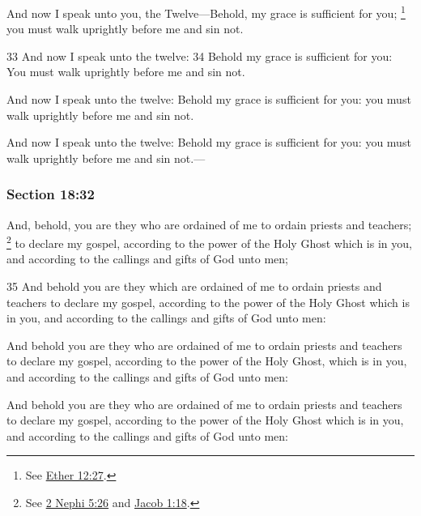 		And now I speak unto you, the Twelve---Behold, my grace is sufficient for you;%
			\footnote{%
				See \hyperref[ETHER-12-27]{Ether 12:27}.
				}
		you must walk uprightly before me and sin not.

		\begin{framed}
		\scriptsize
			\begin{compactdesc}
				\item[JSP] 33 And now I speak unto the twelve: 34 Behold my grace is sufficient for you: You must walk uprightly before me and sin not.
				\item[DC 1835] And now I speak unto the twelve: Behold my grace is sufficient for you: you must walk uprightly before me and sin not. 
				\item[DC 1844] And now I speak unto the twelve: Behold my grace is sufficient for you: you must walk uprightly before me and sin not.--- 
			\end{compactdesc}
		\end{framed}

	\subsubsection{Section 18:32} %
		\label{DC18-32}

		And, behold, you are they who are ordained of me to ordain priests and teachers;%
			\footnote{%
				See \hyperref[2NEPHI-5-26]{2 Nephi 5:26} and \hyperref[JACOB-1-18]{Jacob 1:18}.
				}
		to declare my gospel, according to the power of the Holy Ghost which is in you, and according to the callings and gifts of God unto men;

		\begin{framed}
		\scriptsize
			\begin{compactdesc}
				\item[JSP] 35 And behold you are they which are ordained of me to ordain priests and teachers to declare my gospel, according to the power of the Holy Ghost which is in you, and according to the callings and gifts of God unto men:
				\item[DC 1835] And behold you are they who are ordained of me to ordain priests and teachers to declare my gospel, according to the power of the Holy Ghost, which is in you, and according to the callings and gifts of God unto men: 
				\item[DC 1844] And behold you are they who are ordained of me to ordain priests and teachers to declare my gospel, according to the power of the Holy Ghost which is in you, and according to the callings and gifts of God unto men: 
			\end{compactdesc}
		\end{framed}


